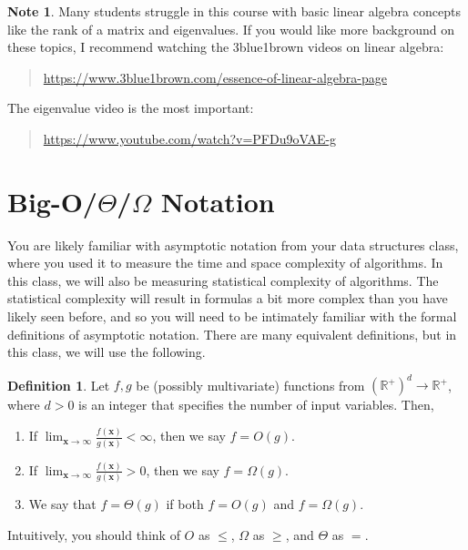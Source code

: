 \documentclass[10pt]{article}
\theoremstyle{definition}
\newtheorem{note}{Note}
\newtheorem{defn}{Definition}
\newcommand{\R}{\mathbb R}
\newcommand{\x}{\mathbf x}
\begin{document}
\begin{note}
Many students struggle in this course with basic linear algebra concepts like the rank of a matrix and eigenvalues.
If you would like more background on these topics, I recommend watching the 3blue1brown videos on linear algebra:
\begin{quote}
    \url{https://www.3blue1brown.com/essence-of-linear-algebra-page}
\end{quote}
The eigenvalue video is the most important:
\begin{quote}
    \url{https://www.youtube.com/watch?v=PFDu9oVAE-g}
\end{quote}
\end{note}

\section{Big-O/$\Theta$/$\Omega$ Notation}

You are likely familiar with asymptotic notation from your data structures class,
where you used it to measure the time and space complexity of algorithms.
In this class,
we will also be measuring statistical complexity of algorithms.
The statistical complexity will result in formulas a bit more complex than you have likely seen before,
and so you will need to be intimately familiar with the formal definitions of asymptotic notation.
There are many equivalent definitions, but in this class, we will use the following.

\begin{defn}
    Let $f,g$ be (possibly multivariate) functions from $(\R^+)^d\to\R^+$,
    where $d>0$ is an integer that specifies the number of input variables.
    Then,
    \begin{enumerate}
        \item If $\displaystyle\lim_{\x\to\infty} \frac{f(\x)}{g(\x)} < \infty$, then we say $f = O(g)$.
        \item If $\displaystyle\lim_{\x\to\infty} \frac{f(\x)}{g(\x)} > 0$, then we say $f = \Omega(g)$.
        \item We say that $f = \Theta(g)$ if both $f=O(g)$ and $f=\Omega(g)$.
    \end{enumerate}
    Intuitively, you should think of $O$ as $\le$, $\Omega$ as $\ge$, and $\Theta$ as $=$.
\end{defn}
\end{document}
